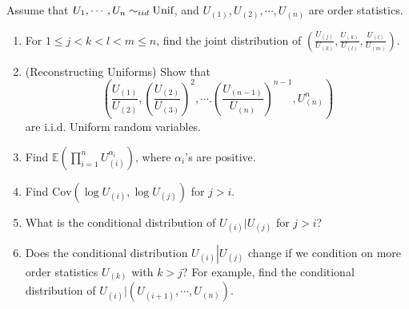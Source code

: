 \documentclass[
  letterpaper,
  DIV=11,
  numbers=noendperiod]{scrreprt}
\theoremstyle{plain}
\theoremstyle{definition}
\theoremstyle{remark}
\begin{document}
Assume that \(U_1, \cdots, U_n \sim_{iid} \textnormal{Unif}\), and
\(U_{(1)},U_{(2)},\cdots, U_{(n)}\) are order statistics.

\begin{enumerate}
\def\labelenumi{(\alph{enumi})}
\item
  For \(1 \leq j < k < l < m \leq n\), find the joint distribution of
  \(\left( \frac{U_{(j)}}{U_{(k)}}, \frac{U_{(k)}}{U_{(l)}}, \frac{U_{(l)}}{U_{(m)}}\right).\)
\item
  (Reconstructing Uniforms) Show that
  \[\left( \frac{U_{(1)}}{U_{(2)}}, \left(\frac{U_{(2)}}{U_{(3)}}\right)^2,\cdots. \left(\frac{U_{(n-1)}}{U_{(n)}}\right)^{n-1}, U_{(n)}^n \right)\]
  are i.i.d. Uniform random variables.
\item
  Find \(\mathbb{E}\left(\prod_{i=1}^{n} U^{\alpha_i}_{(i)}\right)\),
  where \(\alpha_i\)'s are positive.
\item
  Find \(\mathrm{Cov}\left(\log U_{(i)}, \log U_{(j)}\right)\) for
  \(j > i\).
\item
  What is the conditional distribution of \(U_{(i)} | U_{(j)}\) for
  \(j > i\)?
\item
  Does the conditional distribution \(U_{(i)}\left|U_{(j)}\right.\)
  change if we condition on more order statistics \(U_{(k)}\) with
  \(k > j\)? For example, find the conditional distribution of
  \(U_{(i)}| (U_{(i+1)},\cdots, U_{(n)}).\)
\end{enumerate}
\end{document}
